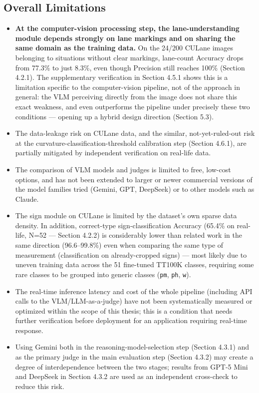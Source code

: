 \documentclass[12pt,a4paper]{report}
\begin{document}
\subsection{Overall Limitations}

\begin{itemize}
    \item \textbf{At the computer-vision processing step, the lane-understanding module depends strongly on lane markings and on sharing the same domain as the training data.} On the 24/200 CULane images belonging to situations without clear markings, lane-count Accuracy drops from 77.3\% to just 8.3\%, even though Precision still reaches 100\% (Section 4.2.1). The supplementary verification in Section 4.5.1 shows this is a limitation specific to the computer-vision pipeline, not of the approach in general: the VLM perceiving directly from the image does not share this exact weakness, and even outperforms the pipeline under precisely these two conditions --- opening up a hybrid design direction (Section 5.3).
    \item The data-leakage risk on CULane data, and the similar, not-yet-ruled-out risk at the curvature-classification-threshold calibration step (Section 4.6.1), are partially mitigated by independent verification on real-life data.
    \item The comparison of VLM models and judges is limited to free, low-cost options, and has not been extended to larger or newer commercial versions of the model families tried (Gemini, GPT, DeepSeek) or to other models such as Claude.
    \item The sign module on CULane is limited by the dataset's own sparse data density. In addition, correct-type sign-classification Accuracy (65.4\% on real-life, N=52 --- Section 4.2.2) is considerably lower than related work in the same direction (96.6--99.8\%) even when comparing the same type of measurement (classification on already-cropped signs) --- most likely due to uneven training data across the 51 fine-tuned TT100K classes, requiring some rare classes to be grouped into generic classes (\texttt{pm}, \texttt{ph}, \texttt{w}).
    \item The real-time inference latency and cost of the whole pipeline (including API calls to the VLM/LLM-as-a-judge) have not been systematically measured or optimized within the scope of this thesis; this is a condition that needs further verification before deployment for an application requiring real-time response.
    \item Using Gemini both in the reasoning-model-selection step (Section 4.3.1) and as the primary judge in the main evaluation step (Section 4.3.2) may create a degree of interdependence between the two stages; results from GPT-5 Mini and DeepSeek in Section 4.3.2 are used as an independent cross-check to reduce this risk.
\end{itemize}
\end{document}
